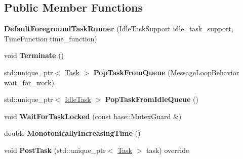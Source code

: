 \subsection*{Public Member Functions}
\begin{DoxyCompactItemize}
\item 
\mbox{\label{classv8_1_1platform_1_1DefaultForegroundTaskRunner_a5dc5e969e4a3ba22fb80999d609308f7}} 
{\bfseries Default\+Foreground\+Task\+Runner} (Idle\+Task\+Support idle\+\_\+task\+\_\+support, Time\+Function time\+\_\+function)
\item 
\mbox{\label{classv8_1_1platform_1_1DefaultForegroundTaskRunner_a09ab9f269f09c73814cddbc967265cce}} 
void {\bfseries Terminate} ()
\item 
\mbox{\label{classv8_1_1platform_1_1DefaultForegroundTaskRunner_a2034bcb0e46b55dad446e7cf76d22c87}} 
std\+::unique\+\_\+ptr$<$ \mbox{\hyperlink{classv8_1_1Task}{Task}} $>$ {\bfseries Pop\+Task\+From\+Queue} (Message\+Loop\+Behavior wait\+\_\+for\+\_\+work)
\item 
\mbox{\label{classv8_1_1platform_1_1DefaultForegroundTaskRunner_a4864af369db103469b3daea83ddbd8e7}} 
std\+::unique\+\_\+ptr$<$ \mbox{\hyperlink{classv8_1_1IdleTask}{Idle\+Task}} $>$ {\bfseries Pop\+Task\+From\+Idle\+Queue} ()
\item 
\mbox{\label{classv8_1_1platform_1_1DefaultForegroundTaskRunner_a6d9d16f7d4ac83529f8d65d7c528b255}} 
void {\bfseries Wait\+For\+Task\+Locked} (const base\+::\+Mutex\+Guard \&)
\item 
\mbox{\label{classv8_1_1platform_1_1DefaultForegroundTaskRunner_ae86e21d09c2828455645d9579623ecbf}} 
double {\bfseries Monotonically\+Increasing\+Time} ()
\item 
\mbox{\label{classv8_1_1platform_1_1DefaultForegroundTaskRunner_adae62b0d8f45ebe0dd6f6a79636db6b2}} 
void {\bfseries Post\+Task} (std\+::unique\+\_\+ptr$<$ \mbox{\hyperlink{classv8_1_1Task}{Task}} $>$ task) override

\end{DoxyCompactItemize}
